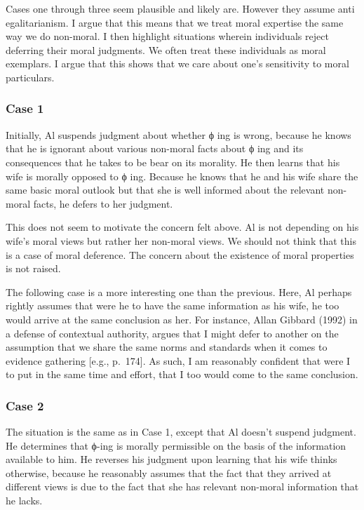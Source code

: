\documentclass[
  letterpaper,
  DIV=11,
  numbers=noendperiod]{scrartcl}
\theoremstyle{remark}
\begin{document}
Cases one through three seem plausible and likely are. However they
assume anti egalitarianism. I argue that this means that we treat moral
expertise the same way we do non-moral. I then highlight situations
wherein individuals reject deferring their moral judgments. We often
treat these individuals as moral exemplars. I argue that this shows that
we care about one's sensitivity to moral particulars.

\subsubsection{Case 1}\label{case-1}

Initially, Al suspends judgment about whether ϕ ing is wrong, because he
knows that he is ignorant about various non-moral facts about ϕ ing and
its consequences that he takes to be bear on its morality. He then
learns that his wife is morally opposed to ϕ ing. Because he knows that
he and his wife share the same basic moral outlook but that she is well
informed about the relevant non-moral facts, he defers to her judgment.

This does not seem to motivate the concern felt above. Al is not
depending on his wife's moral views but rather her non-moral views. We
should not think that this is a case of moral deference. The concern
about the existence of moral properties is not raised.

The following case is a more interesting one than the previous. Here, Al
perhaps rightly assumes that were he to have the same information as his
wife, he too would arrive at the same conclusion as her. For instance,
Allan Gibbard (1992) in a defense of contextual authority, argues that I
might defer to another on the assumption that we share the same norms
and standards when it comes to evidence gathering {[}e.g., p.~174{]}. As
such, I am reasonably confident that were I to put in the same time and
effort, that I too would come to the same conclusion.

\subsubsection{Case 2}\label{case-2}

The situation is the same as in Case 1, except that Al doesn't suspend
judgment. He determines that ϕ-ing is morally permissible on the basis
of the information available to him. He reverses his judgment upon
learning that his wife thinks otherwise, because he reasonably assumes
that the fact that they arrived at different views is due to the fact
that she has relevant non-moral information that he lacks.
\end{document}

